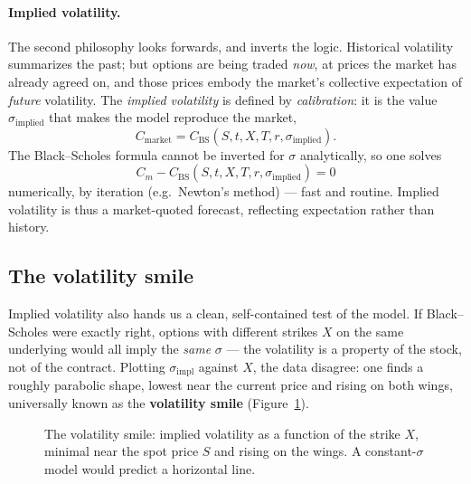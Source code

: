 \paragraph*{Implied volatility.}

The second philosophy looks forwards, and inverts the logic.
Historical volatility summarizes the past; but options are being traded \emph{now}, at prices the market has already agreed on, and those prices embody the market's collective expectation of \emph{future} volatility.
The \emph{implied volatility} is defined by \emph{calibration}: it is the value $\sigma_{\text{implied}}$ that makes the model reproduce the market,
\begin{equation}
C_{\text{market}} = C_{\text{BS}}(S, t, X, T, r, \sigma_{\text{implied}}).
\end{equation}
The Black--Scholes formula cannot be inverted for $\sigma$ analytically, so one solves
\begin{equation}
C_m - C_{\text{BS}}(S, t, X, T, r, \sigma_{\text{implied}}) = 0
\end{equation}
numerically, by iteration (e.g.\ Newton's method) --- fast and routine.
Implied volatility is thus a market-quoted forecast, reflecting expectation rather than history.

\subsection{The volatility smile}\label{sec:volatility-smile}

Implied volatility also hands us a clean, self-contained test of the model.
If Black--Scholes were exactly right, options with different strikes $X$ on the same underlying would all imply the \emph{same} $\sigma$ --- the volatility is a property of the stock, not of the contract.
Plotting $\sigma_{\text{impl}}$ against $X$, the data disagree: one finds a roughly parabolic shape, lowest near the current price and rising on both wings, universally known as the \textbf{volatility smile} (Figure~\ref{fig:smile}).

\begin{figure}[h!]
\centering
{}
\caption{The volatility smile: implied volatility as a function of the strike $X$, minimal near the spot price $S$ and rising on the wings. A constant-$\sigma$ model would predict a horizontal line.}
\label{fig:smile}
\end{figure}


